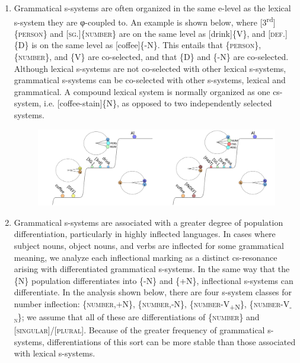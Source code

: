 \begin{enumerate}
\item Grammatical s-systems are often organized in the same e-level as the lexical s-system they are φ-coupled to. An example is shown below, where [3\textsuperscript{rd}]\{\textsc{person}\} and [\textsc{sg.}]\{\textsc{number}\} are on the same level as [drink]\{V\}, and [\textsc{def}.]\{D\} is on the same level as [coffee]\{-N\}. This entails that \{\textsc{person}\}, \{\textsc{number}\}, and \{V\} are co-selected, and that \{D\} and \{-N\} are co-selected. Although lexical s-systems are not co-selected with other lexical s-systems, grammatical s-systems can be co-selected with other s-systems, lexical and grammatical. A compound lexical system is normally organized as one cs-system, i.e. [coffee-stain]\{N\}, as opposed to two independently selected systems.

  
\begin{figure}
\includegraphics[width=\textwidth]{figures/Tilsen-img66.png}
\caption{\missingcaption}
\label{fig:4:16}
\end{figure}
 

\item  Grammatical s-systems are associated with a greater degree of population differentiation, particularly in highly inflected languages. In cases where subject nouns, object nouns, and verbs are inflected for some grammatical meaning, we analyze each inflectional marking as a distinct cs-resonance arising with differentiated grammatical s-systems. In the same way that the \{N\} population differentiates into \{-N\} and \{+N\}, inflectional s-systems can differentiate. In the analysis shown below, there are four s-system classes for number inflection: \{\textsc{number},+N\}, \{\textsc{number},-N\}, \{\textsc{number}{}-\textsc{V}\textsc{\textsubscript{+N}}\textsc{\}}, \{\textsc{number}{}-\textsc{V}\textsc{\textsubscript{{}-n}}\textsc{\};} we assume that all of these are differentiations of \{\textsc{number}\} and [\textsc{singular}]/[\textsc{plural}]. Because of the greater frequency of grammatical s-systems, differentiations of this sort can be more stable than those associated with lexical s-systems. 


\end{enumerate}
